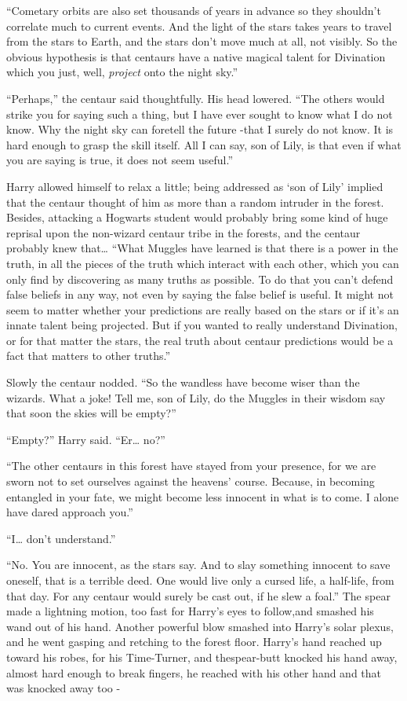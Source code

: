 ``Cometary orbits are also set thousands of years in advance so they shouldn't correlate much to current events. And the light of the stars takes years to travel from the stars to Earth, and the stars don't move much at all, not visibly. So the obvious hypothesis is that centaurs have a native magical talent for Divination which you just, well, \emph{project} onto the night sky.''

``Perhaps,'' the centaur said thoughtfully. His head lowered. ``The others would strike you for saying such a thing, but I have ever sought to know what I do not know. Why the night sky can foretell the future -that I surely do not know. It is hard enough to grasp the skill itself. All I can say, son of Lily, is that even if what you are saying is true, it does not seem useful.''

Harry allowed himself to relax a little; being addressed as `son of Lily' implied that the centaur thought of him as more than a random intruder in the forest. Besides, attacking a Hogwarts student would probably bring some kind of huge reprisal upon the non-wizard centaur tribe in the forests, and the centaur probably knew that\ldots{} ``What Muggles have learned is that there is a power in the truth, in all the pieces of the truth which interact with each other, which you can only find by discovering as many truths as possible. To do that you can't defend false beliefs in any way, not even by saying the false belief is useful. It might not seem to matter whether your predictions are really based on the stars or if it's an innate talent being projected. But if you wanted to really understand Divination, or for that matter the stars, the real truth about centaur predictions would be a fact that matters to other truths.''

Slowly the centaur nodded. ``So the wandless have become wiser than the wizards. What a joke! Tell me, son of Lily, do the Muggles in their wisdom say that soon the skies will be empty?''

``Empty?'' Harry said. ``Er\ldots{} no?''

``The other centaurs in this forest have stayed from your presence, for we are sworn not to set ourselves against the heavens' course. Because, in becoming entangled in your fate, we might become less innocent in what is to come. I alone have dared approach you.''

``I\ldots{} don't understand.''

``No. You are innocent, as the stars say. And to slay something innocent to save oneself, that is a terrible deed. One would live only a cursed life, a half-life, from that day. For any centaur would surely be cast out, if he slew a foal.''
The spear made a lightning motion, too fast for Harry's eyes to follow,and smashed his wand out of his hand.
Another powerful blow smashed into Harry's solar plexus, and he went gasping and retching to the forest floor.
Harry's hand reached up toward his robes, for his Time-Turner, and thespear-butt knocked his hand away, almost hard enough to break fingers, he reached with his other hand and that was knocked away too -

